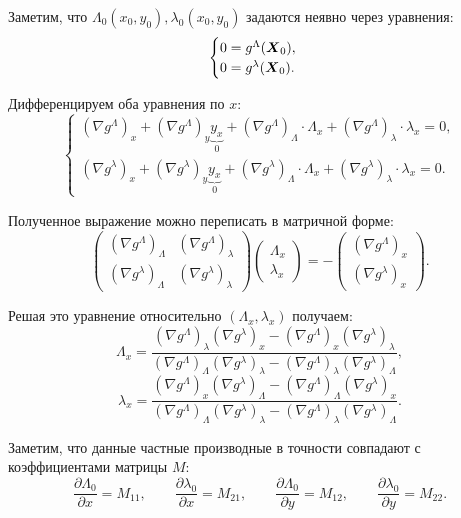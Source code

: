 \begin{enumerate}
Заметим, что $\Lambda_0(x_0,y_0), \lambda_0(x_0,y_0)$ задаются неявно через уравнения:
\begin{equation}
    \begin{cases}
        0=g^\Lambda(\boldsymbol{X}_0), \\
        0=g^\lambda(\boldsymbol{X}_0). \\
    \end{cases}
\end{equation}

Дифференцируем оба уравнения по \(x\):
\[
\begin{cases}
(\nabla g^\Lambda)_x + (\nabla g^\Lambda)_y \underbrace{y_x}_0 + (\nabla g^\Lambda)_\Lambda \cdot \Lambda_x + (\nabla g^\Lambda)_\lambda \cdot \lambda_x = 0, \\
(\nabla g^\lambda)_x + (\nabla g^\lambda)_y \underbrace{y_x}_0 + (\nabla g^\lambda)_\Lambda \cdot \Lambda_x + (\nabla g^\lambda)_\lambda \cdot \lambda_x = 0.
\end{cases}
\]

Полученное выражение можно переписать в матричной форме:
\[
\begin{pmatrix}
(\nabla g^\Lambda)_\Lambda & (\nabla g^\Lambda)_\lambda \\
(\nabla g^\lambda)_\Lambda & (\nabla g^\lambda)_\lambda
\end{pmatrix}
\begin{pmatrix}
\Lambda_x \\
\lambda_x
\end{pmatrix}
= -
\begin{pmatrix}
(\nabla g^\Lambda)_x \\
(\nabla g^\lambda)_x
\end{pmatrix}.
\]

Решая это уравнение относительно $(\Lambda_x,\lambda_x)$ получаем:
$$
\Lambda_x = \frac{(\nabla g^\Lambda)_\lambda (\nabla g^\lambda)_x - (\nabla g^\Lambda)_x (\nabla g^\lambda)_\lambda}{(\nabla g^\Lambda)_\Lambda (\nabla g^\lambda)_\lambda - (\nabla g^\Lambda)_\lambda (\nabla g^\lambda)_\Lambda},
$$
$$
\lambda_x = \frac{(\nabla g^\Lambda)_x (\nabla g^\lambda)_\Lambda - (\nabla g^\Lambda)_\Lambda (\nabla g^\lambda)_x}{(\nabla g^\Lambda)_\Lambda (\nabla g^\lambda)_\lambda - (\nabla g^\Lambda)_\lambda (\nabla g^\lambda)_\Lambda}.
$$

Заметим, что данные частные производные в точности совпадают с коэффициентами матрицы $M$:
$$
\frac{\partial \Lambda_0}{\partial x} = M_{11}, \qquad
\frac{\partial \lambda_0}{\partial x} = M_{21}, \qquad
\frac{\partial \Lambda_0}{\partial y} = M_{12}, \qquad
\frac{\partial \lambda_0}{\partial y} = M_{22}.
$$


\end{enumerate}
